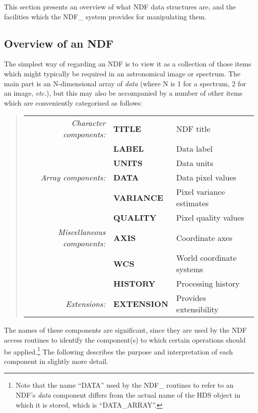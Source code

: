 \documentclass[twoside,11pt]{article}
\newcommand{\xref}[3]{#1}
\newcommand{\xlabel}[1]{}
\newcommand{\st}[1]{{\em{#1}}}
\begin{document}
This section presents an overview of what NDF data structures are, and the
facilities which the NDF\_ system provides for manipulating them. 

\subsection{\xlabel{overview_of_an_ndf}\label{ss:componentnames}Overview of an NDF}

The simplest way of regarding an NDF is to view it as a collection of those
items which might typically be required in an astronomical image or
spectrum. 
The main part is an N-dimensional array of \st{data\/} (where N is 1 for a
spectrum, 2 for an image, \st{etc.}), but this may also be accompanied by a
number of other items which are conveniently categorised as follows: 

\small
\begin{quote}
\begin{center}
\begin{tabular}{rl@{ --- }l}
    \st{Character components:} & {\bf TITLE} & NDF title\\
                                & {\bf LABEL} & Data label\\
                                & {\bf UNITS} & Data units\\[1ex]
        \st{Array components:} & {\bf DATA}  & Data pixel values\\
                                & {\bf VARIANCE} & Pixel variance estimates\\
                                & {\bf QUALITY} & Pixel quality values\\[1ex]
\st{Miscellaneous components:} & {\bf AXIS} & Coordinate axes\\
                                & {\bf WCS} & World coordinate systems\\
                                & {\bf HISTORY} & Processing history\\[1ex]
              \st{Extensions:} & {\bf EXTENSION} & Provides extensibility
\end{tabular}
\end{center}
\end{quote}
\normalsize

The names of these components are significant, since they are used by the
NDF access routines to identify the component(s) to which certain operations
should be applied.\footnote{Note that the name ``DATA'' used by the
NDF\_ routines to refer to an NDF's \st{data\/} component differs
from the actual name of the \xref{HDS object}{sun92}{HDS_objects} in
which it is stored, which is ``DATA\_ARRAY''.}
The following describes the purpose and interpretation of each component in 
slightly more detail.
\end{document}
